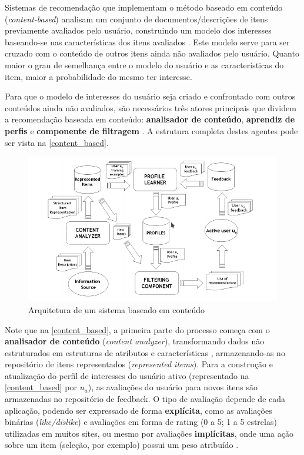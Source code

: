 \documentclass[12pt, openright, oneside, a4paper, brazil]{abntex2}
\begin{document}
Sistemas de recomendação que implementam o método baseado em conteúdo (\textit{content-based}) analisam um conjunto de documentos/descrições de itens previamente avaliados pelo usuário, construindo um modelo dos interesses baseando-se nas características dos itens avaliados \cite{mladenic1999text, adomavicius2005toward, lops2011content}. Este modelo serve para ser cruzado com o conteúdo de outros itens ainda não avaliados pelo usuário. Quanto maior o grau de semelhança entre o modelo do usuário e as características do item, maior a probabilidade do mesmo ter interesse.

Para que o modelo de interesses do usuário seja criado e confrontado com outros conteúdos ainda não avaliados, são necessários três atores principais que dividem a recomendação baseada em conteúdo: \textbf{analisador de conteúdo}, \textbf{aprendiz de perfis} e \textbf{componente de filtragem} \cite{lops2011content}. A estrutura completa destes agentes pode ser vista na \autoref{content_based}.

\begin{figure}[h!tp]
	\caption{\label{content_based}Arquitetura de um sistema baseado em conteúdo}

	\begin{center}
		\includegraphics[scale=0.75]{images/content_based.png}
	\end{center}

\end{figure}

Note que na \autoref{content_based}, a primeira parte do processo começa com o \textbf{analisador de conteúdo} (\textit{content analyzer}), transformando dados não estruturados em estruturas de atributos e características \cite{lops2011content, mladenic1999text}, armazenando-as no repositório de itens representados (\textit{represented items}). Para a construção e atualização do perfil de interesses do usuário ativo (representado na \autoref{content_based} por $u_{a}$), as avaliações do usuário para novos itens são armazenadas no repositório de feedback. O tipo de avaliação depende de cada aplicação, podendo ser expressado de forma \textbf{explícita}, como as avaliações binárias (\textit{like/dislike}) e avaliações em forma de rating (0 a 5; 1 a 5 estrelas) utilizadas em muitos sites, ou mesmo por avaliações \textbf{implícitas}, onde uma ação sobre um item (seleção, por exemplo) possui um peso atribuído \cite{pazzani2007content}.
\end{document}
